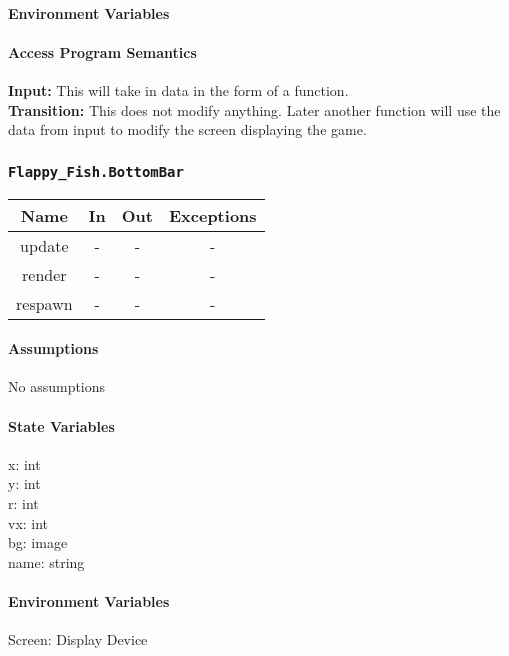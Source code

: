 \documentclass[11pt, oneside]{article}   	%
\begin{document}
\paragraph{Environment Variables}


\paragraph{Access Program Semantics} 
 \textbf{Input:} This will take in data in the form of a function. \\
 \textbf{Transition:} This does not modify anything. Later another function will use the data from input to modify the screen displaying the game.



\subsubsection{\texttt{Flappy\_Fish.BottomBar}}



\begin{center}
\begin{tabular}{ |c|c|c|c| } 
 \hline
 Name & In & Out & Exceptions \\ 
 \hline \hline
 update & - & - & - \\ 
render & - & - & - \\ 
respawn & - & - & - \\ 
 \hline
\end{tabular}
\end{center}

\paragraph{Assumptions}
No assumptions

\paragraph{State Variables}
x: int\\
y: int\\
r: int\\
vx: int \\
bg: image \\
name: string\\
\paragraph{Environment Variables}
Screen: Display Device
\end{document}
